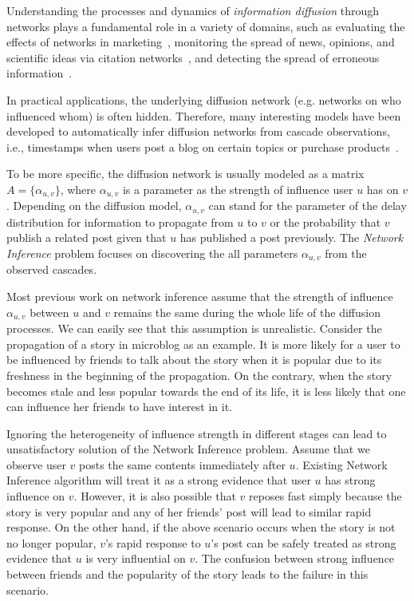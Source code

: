 Understanding the processes and dynamics of \emph{information diffusion} through networks plays a fundamental role in a variety of domains, such as evaluating the effects of networks in marketing~\cite{domingos:2001,kempe:2003,leskovec:2007a}, monitoring the spread of news, opinions, and scientific ideas via citation networks~\cite{adar:2004,gruhl:2004,leskovec:2005}, and detecting the spread of erroneous information~\cite{dong:2009}.

In practical applications, the underlying diffusion network (e.g. networks on who influenced whom) is often hidden. Therefore, many interesting models have been developed to automatically infer diffusion networks from cascade observations, i.e., timestamps when users post a blog on certain topics or purchase products~\cite{gomez-rodriguez:leskovec:krause:inferring,gomez-rodriguez:balduzzi:schoelkopf:uncovering,yang:zha:mutualExciting,zhou:zha:song:mutualExciting,Wang:Hu:Philip:Li:multiAspect,Daneshmand:Gomez:Song:recovery14,Du:Song:Song:Alex:HeterogeneousInf,Du:Song:Woo:Zha:topicCascade}. 


To be more specific, the diffusion network is usually modeled as a matrix $A=\{\alpha_{u,v}\}$, where $\alpha_{u,v}$ is a parameter as the strength of influence user $u$ has on $v$. Depending on the diffusion model, $\alpha_{u,v}$ can stand for the parameter of the delay distribution for information to propagate from $u$ to $v$ or the probability that $v$ publish a related post given that $u$ has published a post previously. The \emph{Network Inference} problem focuses on discovering the all parameters $\alpha_{u,v}$ from the observed cascades. 



Most previous work on network inference assume that the strength of influence $\alpha_{u,v}$ between $u$ and $v$ remains the same during the whole life of the diffusion processes. We can easily see that this assumption is unrealistic. Consider the propagation of a story in microblog as an example. It is more likely for a user to be influenced by friends to talk about the story when it is popular due to its freshness in the beginning of the propagation. On the contrary, when the story becomes stale and less popular towards the end of its life, it is less likely that one can influence her friends to have interest in it. 


Ignoring the heterogeneity of influence strength in different stages can lead to unsatisfactory solution of the Network Inference problem. Assume that we observe user $v$ posts the same contents immediately after $u$. Existing Network Inference algorithm will treat it as a strong evidence that user $u$ has strong influence on $v$. However, it is also possible that $v$ reposes fast simply because the story is very popular and any of her friends' post will lead to similar rapid response. On the other hand, if the above scenario occurs when the story is not no longer popular, $v$'s rapid response to $u$'s post can be safely treated as strong evidence that $u$ is very influential on $v$. The confusion between strong influence between friends and the popularity of the story leads to the failure in this scenario.  


